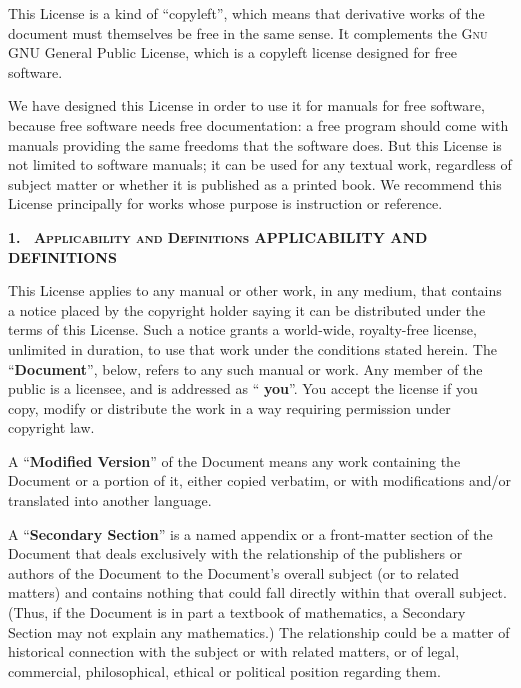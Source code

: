 This License is a kind of \enquote{copyleft}, which means
that derivative works of the document must themselves be
free in the same sense. It complements the
\ifgfdl@sc
  \textsc{Gnu}
\else
  GNU
\fi
General Public License, which is a copyleft license designed
for free software.

We have designed this License in order to use it for manuals
for free software, because free software needs free
documentation: a free program should come with manuals
providing the same freedoms that the software does. But
this License is not limited to software manuals; it can be
used for any textual work, regardless of subject matter or
whether it is published as a printed book. We recommend this
License principally for works whose purpose is instruction
or reference.

\medskip
\begin{center}
  \textbf{%
    \Large
    1.\
    \ifgfdl@sc
      \textsc{Applicability and Definitions}%
    \else
      APPLICABILITY AND DEFINITIONS%
    \fi
  }
\end{center}

\noindent
This License applies to any manual or other work, in any
medium, that contains a notice placed by the copyright
holder saying it can be distributed under the terms of this
License. Such a notice grants a world-wide, royalty-free
license, unlimited in duration, to use that work under the
conditions stated herein. The \enquote{\textbf{Document}},
below, refers to any such manual or work. Any member of the
public is a licensee, and is addressed as \enquote{%
  \textbf{you}}. You accept the license if you copy, modify
or distribute the work in a way requiring permission under
copyright law.

A \enquote{\textbf{Modified Version}} of the Document means
any work containing the Document or a portion of it, either
copied verbatim, or with modifications and/or translated
into another language.

A \enquote{\textbf{Secondary Section}} is a named appendix
or a front-matter section of the Document that deals
exclusively with the relationship of the publishers or
authors of the Document to the Document's overall subject
(or to related matters) and contains nothing that could fall
directly within that overall subject. (Thus, if the Document
is in part a textbook of mathematics, a Secondary Section
may not explain any mathematics.) The relationship could be
a matter of historical connection with the subject or with
related matters, or of legal, commercial, philosophical,
ethical or political position regarding them.

